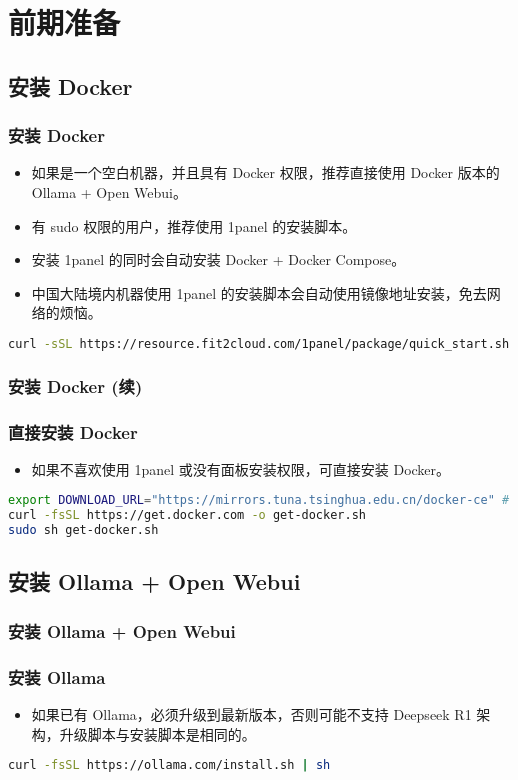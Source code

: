 \section{前期准备}
\subsection{安装 Docker}

\begin{frame}[fragile]
	\frametitle{安装 Docker}
	\begin{itemize}
		\item 如果是一个空白机器，并且具有 Docker 权限，推荐直接使用 Docker 版本的 Ollama + Open Webui。
		\item 有 sudo 权限的用户，推荐使用 1panel 的安装脚本。
		\item 安装 1panel 的同时会自动安装 Docker + Docker Compose。
		\item 中国大陆境内机器使用 1panel 的安装脚本会自动使用镜像地址安装，免去网络的烦恼。
	\end{itemize}
	\begin{lstlisting}[language=bash]
curl -sSL https://resource.fit2cloud.com/1panel/package/quick_start.sh -o quick_start.sh && sudo bash quick_start.sh
\end{lstlisting}
\end{frame}


\begin{frame}[fragile]
	\frametitle{安装 Docker (续)}
	\subsubsection{直接安装 Docker}
	\begin{itemize}
		\item 如果不喜欢使用 1panel 或没有面板安装权限，可直接安装 Docker。
	\end{itemize}
	\begin{lstlisting}[language=bash]
export DOWNLOAD_URL="https://mirrors.tuna.tsinghua.edu.cn/docker-ce" # 非中国大陆区域可取消这行
curl -fsSL https://get.docker.com -o get-docker.sh
sudo sh get-docker.sh
\end{lstlisting}
\end{frame}

\subsection{安装 Ollama + Open Webui}

\begin{frame}[fragile]
	\frametitle{安装 Ollama + Open Webui}
	\subsubsection{安装 Ollama}
	\begin{itemize}
		\item 如果已有 Ollama，必须升级到最新版本，否则可能不支持 Deepseek R1 架构，升级脚本与安装脚本是相同的。
	\end{itemize}
	\begin{lstlisting}[language=bash]
curl -fsSL https://ollama.com/install.sh | sh
\end{lstlisting}
\end{frame}

